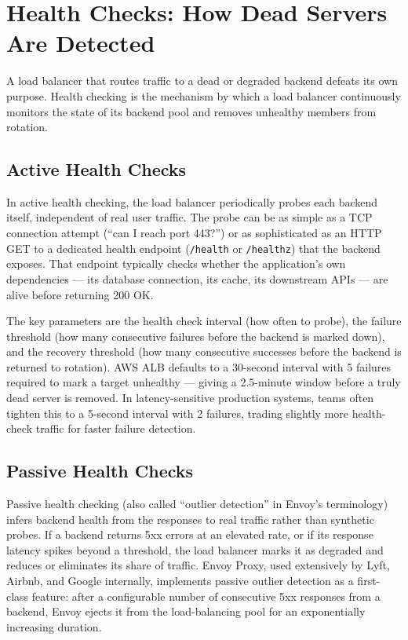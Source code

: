 \documentclass[11pt,a4paper]{article}
\begin{document}
\section{Health Checks: How Dead Servers Are Detected}

A load balancer that routes traffic to a dead or degraded backend defeats its own purpose. Health
checking is the mechanism by which a load balancer continuously monitors the state of its backend
pool and removes unhealthy members from rotation.

\subsection{Active Health Checks}

In active health checking, the load balancer periodically probes each backend itself, independent of
real user traffic. The probe can be as simple as a TCP connection attempt (``can I reach port 443?'')
or as sophisticated as an HTTP GET to a dedicated health endpoint (\texttt{/health} or
\texttt{/healthz}) that the backend exposes. That endpoint typically checks whether the application's
own dependencies --- its database connection, its cache, its downstream APIs --- are alive before
returning 200 OK.

The key parameters are the health check interval (how often to probe), the failure threshold (how
many consecutive failures before the backend is marked down), and the recovery threshold (how many
consecutive successes before the backend is returned to rotation). AWS ALB defaults to a 30-second
interval with 5 failures required to mark a target unhealthy --- giving a 2.5-minute window before
a truly dead server is removed. In latency-sensitive production systems, teams often tighten this
to a 5-second interval with 2 failures, trading slightly more health-check traffic for faster
failure detection.

\subsection{Passive Health Checks}

Passive health checking (also called ``outlier detection'' in Envoy's terminology) infers backend
health from the responses to real traffic rather than synthetic probes. If a backend returns 5xx
errors at an elevated rate, or if its response latency spikes beyond a threshold, the load balancer
marks it as degraded and reduces or eliminates its share of traffic. Envoy Proxy, used extensively
by Lyft, Airbnb, and Google internally, implements passive outlier detection as a first-class
feature: after a configurable number of consecutive 5xx responses from a backend, Envoy ejects it
from the load-balancing pool for an exponentially increasing duration.
\end{document}
